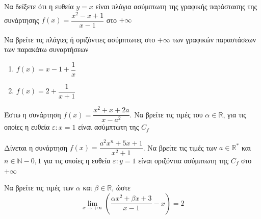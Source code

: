 \documentclass{presentation}
\begin{document}
\begin{askisi}
  Να δείξετε ότι η ευθεία $y=x$ είναι πλάγια ασύμπτωτη της γραφικής παράστασης της συνάρτησης $f(x)=\dfrac{x^2-x+1}{x-1}$ στο $+\infty$

\end{askisi}

\begin{askisi}
  Να βρείτε τις πλάγιες ή οριζόντιες ασύμπτωτες στο $+\infty$ των γραφικών παραστάσεων των παρακάτω συναρτήσεων
  \begin{enumerate}
    \item<1-> $f(x)=x-1+\dfrac{1}{x}$
    \item<2-> $f(x)=2+\dfrac{1}{x+1}$
  \end{enumerate}

\end{askisi}

\begin{askisi}
  Έστω η συνάρτηση $f(x)=\dfrac{x^2+x+2a}{x-a^2}$. Να βρείτε τις τιμές του $α\in\mathbb{R}$, για τις οποίες η ευθεία $ε:x=1$ είναι ασύμπτωτη της $C_f$

\end{askisi}

\begin{askisi}
  Δίνεται η συνάρτηση $f(x)=\dfrac{a^2x^n+5x+1}{x^2+1}$. Να βρείτε τις τιμές των $a\in\mathbb{R}^*$ και $n\in\mathbb{N}-{0,1}$ για τις οποίες η ευθεία $ε:y=1$ είναι οριζόντια ασύμπτωτη της $C_f$ στο $+\infty$

\end{askisi}

\begin{askisi}
  Να βρείτε τις τιμές των $α$ και $β\in\mathbb{R}$, ώστε
  $$\lim\limits_{x \to +\infty}{ \left(   \dfrac{αx^2+βx+3}{x-1}-x \right)}=2$$

\end{askisi}
\end{document}
